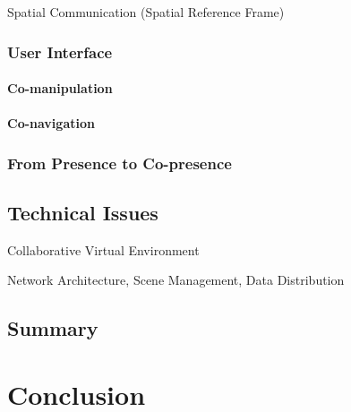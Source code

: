 Spatial Communication (Spatial Reference Frame)

\subsubsection{User Interface}
\paragraph{Co-manipulation}
\paragraph{Co-navigation}

\subsubsection{From Presence to Co-presence}



\subsection{Technical Issues}
Collaborative Virtual Environment

Network Architecture, Scene Management, Data Distribution

\subsection{Summary}


\section{Conclusion}

